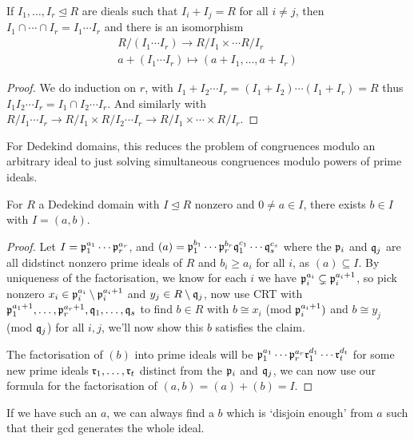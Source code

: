 \documentclass{article}
\begin{document}
\begin{corollary}
    If $I_1,\ldots,I_r\unlhd R$ are dieals such that $I_i+I_j=R$ for all $i\neq j$, then $I_1\cap \cdots \cap I_r = I_1\cdots I_r$ and there is an isomorphism \vspace{-12pt}\begin{gather*}
        R/(I_1\cdots I_r) \rightarrow R/I_1 \times \cdots R/I_r \\
        a + (I_1\cdots I_r) \mapsto (a+I_1,\ldots,a+I_r)
    \end{gather*}
    \begin{proof}
        We do induction on $r$, with $I_1+I_2\cdots I_r = (I_1+I_2)\cdots(I_1+I_r)=R$ thus $I_1I_2\cdots I_r = I_1 \cap I_2\cdots I_r$. And similarly with $R/I_1\cdots I_r \rightarrow R/I_1\times R/I_2\cdots I_r \rightarrow R/I_1\times \cdots \times R/I_r$.
    \end{proof}
\end{corollary}

For Dedekind domains, this reduces the problem of congruences modulo an arbitrary ideal to just solving simultaneous congruences modulo powers of prime ideals.

\begin{proposition}
    For $R$ a Dedekind domain with $I\unlhd R$ nonzero and $0\neq a \in I$, there exists $b\in I$ with $I=(a,b)$.\begin{proof}
        Let $I=\mathfrak{p}_1^{a_1}\cdots \mathfrak{p}_r^{a_r}$, and $(a)=\mathfrak{p}_1^{b_1}\cdots \mathfrak{p}_r^{b_r}\mathfrak{q}_1^{c_1}\cdots\mathfrak{q}_s^{c_s}$ where the $\mathfrak{p}_i$ and $\mathfrak{q}_j$ are all didstinct nonzero prime ideals of $R$ and $b_i\geq a_i$ for all $i$, as $(a)\subseteq I$. By uniqueness of the factorisation, we know for each $i$ we have $\mathfrak{p}_i^{a_i}\subsetneq \mathfrak{p}_i^{a_i+1}$, so pick nonzero $x_i\in\mathfrak{p}_i^{a_i}\setminus\mathfrak{p}_i^{a_i+1}$ and $y_j\in R\setminus \mathfrak{q}_j$, now use CRT with $\mathfrak{p}_1^{a_1+1},\ldots,\mathfrak{p}_r^{a_r+1},\mathfrak{q}_1,\ldots,\mathfrak{q}_s$ to find $b\in R$ with $b\cong x_i$ (mod $\mathfrak{p}_i^{a_i+1})$ and $b\cong y_j$ (mod $\mathfrak{q}_j$) for all $i,j$, we'll now show this $b$ satisfies the claim.

        The factorisation of $(b)$ into prime ideals will be $\mathfrak{p}_1^{a_1}\cdots \mathfrak{p}_r^{a_r}\mathfrak{r}_1^{d_1}\cdots\mathfrak{r}_t^{d_t}$ for some new prime ideals $\mathfrak{r}_1,\ldots,\mathfrak{r}_t$ distinct from the $\mathfrak{p}_i$ and $\mathfrak{q}_j$, we can now use our formula for the factorisation of $(a,b)=(a)+(b)=I$.
    \end{proof}
\end{proposition}

If we have such an $a$, we can always find a $b$ which is `disjoin enough' from $a$ such that their gcd generates the whole ideal.
\end{document}
